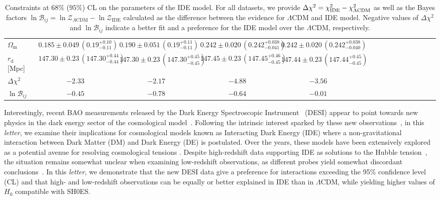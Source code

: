 \documentclass[superscriptaddress,twocolumn,showpacs,a4paper,
amssymb,amsmath,nobibnotes,aps,prl,
showkeys,
nofootinbib,notitlepage]{revtex4-1}
\begin{document}
\begin{table}[htpb!]
\begin{center}
{\begin{tabular}{l c c c c c c c c c c c c c c c }
$ \Omega_\mathrm{m}  $ & $  0.185\pm 0.049\, ( 0.19^{+0.10}_{-0.11} ) $ & $  0.190\pm 0.051\, ( 0.19^{+0.11}_{-0.11} ) $ & $  0.242\pm 0.020\, ( 0.242^{+0.038}_{-0.041} ) $ & $  0.242\pm 0.020\, ( 0.242^{+0.038}_{-0.040} ) $ \\  
$ r_\mathrm{d}  $ [Mpc] & $  147.30\pm 0.23\, ( 147.30^{+0.44}_{-0.44} ) $ & $  147.30\pm 0.23\, ( 147.30^{+0.45}_{-0.45} ) $ & $  147.45\pm 0.23\, ( 147.45^{+0.46}_{-0.45} ) $ & $  147.44\pm 0.23\, ( 147.44^{+0.45}_{-0.45} ) $ \\
\hline
$\Delta \chi^2$ & $-2.33$ & $-2.17$ & $-4.88$ & $-3.56$\\
$\ln \mathcal B_{ij}$ & $-0.45$ & $-0.78$ & $-0.64$ & $-0.01$\\
\hline \hline
\end{tabular} }
\end{center}
\caption{Constraints at $68\%$ ($95\%$) CL on the parameters of the IDE model. For all datasets, we provide $\Delta \chi^2 = \chi^2_{\rm{IDE}} - \chi^2_{\Lambda\rm{CDM}}$ as well as the Bayes factors $\ln \mathcal{B}_{ij} = \ln \mathcal{Z}_{\Lambda\text{CDM}} - \ln \mathcal{Z}_{\text{IDE}}$ calculated as the difference between the evidence for $\Lambda$CDM and IDE model. Negative values of $\Delta \chi^2$ and $\ln \mathcal{B}_{ij}$ indicate a better fit and a preference for the IDE model over the $\Lambda$CDM, respectively.}
\label{tab.results}
\end{table}

Interestingly, recent BAO measurements released by the Dark Energy Spectroscopic Instrument~\cite{DESI:2024uvr,DESI:2024lzq,desicollaboration2024desi} (DESI) appear to point towards new physics in the dark energy sector of the cosmological model~\cite{desicollaboration2024desi}. Following the intrinsic interest sparked by these new observations~\cite{Wang:2024hks,Cortes:2024lgw,Colgain:2024xqj}, in this \textit{letter}, we examine their implications for cosmological models known as Interacting Dark Energy (IDE) where a non-gravitational interaction between Dark Matter (DM) and Dark Energy (DE) is postulated. Over the years, these models have been extensively explored as a potential avenue for resolving cosmological tensions \cite{Zhai:2023yny,Bernui:2023byc,Hoerning:2023hks,Pourtsidou:2016ico,DiValentino:2017iww,Kumar:2017dnp,Lucca:2020zjb}. Despite high-redshift data supporting IDE as solutions to the Hubble tension~\cite{Zhai:2023yny}, the situation remains somewhat unclear when examining low-redshift observations, as different probes yield somewhat discordant conclusions~\cite{Giare:2024ytc,Nunes:2022bhn,Yang:2022csz}. In this \textit{letter}, we demonstrate that the new DESI data give a preference for interactions exceeding the 95\% confidence level (CL) and that high- and low-redshift observations can be equally or better explained in IDE than in $\Lambda$CDM, while yielding higher values of $H_0$ compatible with SH0ES.
\end{document}
